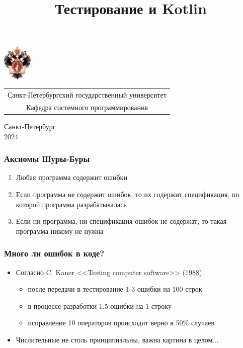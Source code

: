 \documentclass{beamer}
\title[Тестирование]{Тестирование и Kotlin}
\institute[СПбГУ]{}
\author[Кутуев Владимир]{}
\begin{document}
{
\begin{frame}
  \includegraphics[width=1.4cm]{pictures/SPbGU_Logo.png}
\vspace{-35pt}
\hspace{-10pt}
\begin{center}
   \begin{tabular}{c}
        \scriptsize{Санкт-Петербургский государственный университет} \\
        \scriptsize{Кафедра системного программирования}
    \end{tabular}
\titlepage
\end{center}

\btVFill

\begin{center}
  \vspace{5pt}
  \scriptsize{Санкт-Петербург\\
                 2024}
  \end{center}

\end{frame}
}

\begin{frame}[fragile]
  \frametitle{Аксиомы Шуры-Буры}
  \begin{enumerate}
    \item Любая программа содержит ошибки
    \item Если программа не содержит ошибок, то их содержит спецификация, по которой программа разрабатывалась
    \item Если ни программа, ни спецификация ошибок не содержат, то такая программа никому не нужна
  \end{enumerate}
\end{frame}

\begin{frame}
  \frametitle{Много ли ошибок в коде?}
  \begin{itemize}
    \item Согласно C. Kaner <<Testing computer software>> (1988)
    \begin{itemize}
      \item после передачи в тестирование 1-3 ошибки на 100 строк
      \item в процессе разработки 1.5 ошибки на 1 строку
      \item исправление 10 операторов происходит верно в 50\% случаев
    \end{itemize}
    \item Числительные не столь принципиальны, важна картина в целом...
  \end{itemize}

\end{frame}
\end{document}
